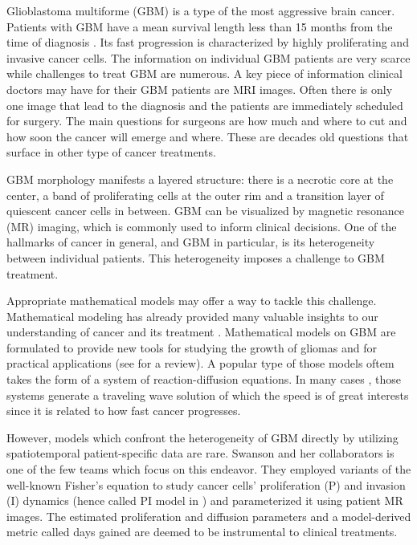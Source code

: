 \documentclass{aims}
\numberwithin{equation}{section}
\begin{document}
Glioblastoma multiforme (GBM) is a type of the most aggressive brain
cancer. Patients with GBM have a mean survival length less than 15
months from the time of diagnosis \cite{Norden2006}. Its fast progression
is characterized by highly proliferating and invasive cancer cells.
The information on individual GBM patients are very scarce while challenges 
to treat GBM are numerous. A key piece of information clinical doctors may 
have for their GBM patients are MRI images. Often there is only one image 
that lead to the diagnosis and the patients are immediately scheduled for 
surgery. The main questions for surgeons are how much and where to cut and 
how soon the cancer will emerge and where. These are decades old questions 
that surface in other type of cancer treatments. 

GBM morphology manifests a layered structure: there is a necrotic
core at the center, a band of proliferating cells at the outer rim
and a transition layer of quiescent cancer cells in between. GBM
can be visualized by magnetic resonance (MR) imaging, which is commonly
used to inform clinical decisions. One of the hallmarks of cancer in 
general, and GBM in particular, is its heterogeneity between individual 
patients. This heterogeneity imposes a challenge to GBM treatment. 

Appropriate mathematical models may offer a way to tackle this challenge. 
Mathematical modeling has already provided many valuable insights to our 
understanding of cancer and its treatment \cite{Kuang}. Mathematical models 
on GBM are formulated to provide new tools for studying the growth of gliomas and for practical applications (see \cite{GBMreview} for a review). A popular type of those models oftem takes the form of a system of reaction-diffusion equations. In many cases \cite{Harley2014,Gerlee2016,Stepien2018},
those systems generate a traveling wave solution of which the speed
is of great interests since it is related to how fast cancer progresses. 

However, models which confront the heterogeneity of GBM directly by
utilizing spatiotemporal patient-specific data are rare. Swanson
and her collaborators \cite{Swanson2008,Neal2013,Jackson2015a} is
one of the few teams which focus on this endeavor. They employed 
variants of the well-known Fisher's equation to study cancer cells'
proliferation (P) and invasion (I) dynamics \cite{FISHER1937} 
(hence called PI model in \cite{Jackson2015a})
and parameterized it using patient MR images. The estimated proliferation
and diffusion parameters and a model-derived metric called days gained
are deemed to be instrumental to clinical treatments. 
\end{document}
